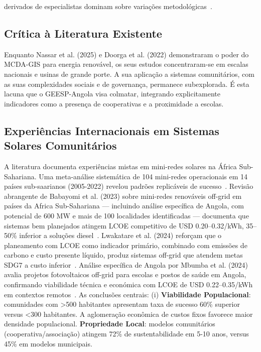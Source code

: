 \documentclass[12pt, a4paper]{article}
\begin{document}
derivados de especialistas dominam sobre variações metodológicas~\citep{Yildiz2025}.

\subsection{Crítica à Literatura Existente}
Enquanto Nassar et al. (2025) e Doorga et al. (2022) demonstraram o poder do MCDA-GIS para energia renovável, os seus estudos concentraram-se em escalas nacionais e usinas de grande porte. A sua aplicação a sistemas comunitários, com as suas complexidades sociais e de governança, permanece subexplorada. É esta lacuna que o GEESP-Angola visa colmatar, integrando explicitamente indicadores como a presença de cooperativas e a proximidade a escolas.

\subsection{Experiências Internacionais em Sistemas Solares Comunitários}
A literatura documenta experiências mistas em mini-redes solares na África Sub-Sahariana. Uma meta-análise sistemática de 104 mini-redes operacionais em 14 países sub-saarianos (2005-2022) revelou padrões replicáveis de sucesso~\citep{Duran2021}. Revisão abrangente de Babayomi et al. (2023) sobre mini-redes renováveis off-grid em países da Africa Sub-Sahariana — incluindo análise específica de Angola, com potencial de 600 MW e mais de 100 localidades identificadas — documenta que sistemas bem planejados atingem LCOE competitivo de USD 0.20–0.32/kWh, 35–50\% inferior a soluções diesel~\citep{Babayomi2023}. Lwakatare et al. (2024) reforçam que o planeamento com LCOE como indicador primário, combinado com emissões de carbono e custo presente líquido, produz sistemas off-grid que atendem metas SDG7 a custo inferior~\citep{Lwakatare2024}. Análise específica de Angola por Mbumba et al. (2024) avalia projetos fotovoltaicos off-grid para escolas e postos de saúde em Angola, confirmando viabilidade técnica e económica com LCOE de USD 0.22–0.35/kWh em contextos remotos~\citep{Mbumba2024}. As conclusões centrais: (i) 
\textbf{Viabilidade Populacional}: comunidades com >500 habitantes apresentam taxa de sucesso 60\% superior versus <300 habitantes. A aglomeração econômica de custos fixos favorece maior densidade populacional.
\textbf{Propriedade Local}: modelos comunitários (cooperativa/associação) atingem 72\% de sustentabilidade em 5-10 anos, versus 45\% em modelos municipais.
\end{document}
